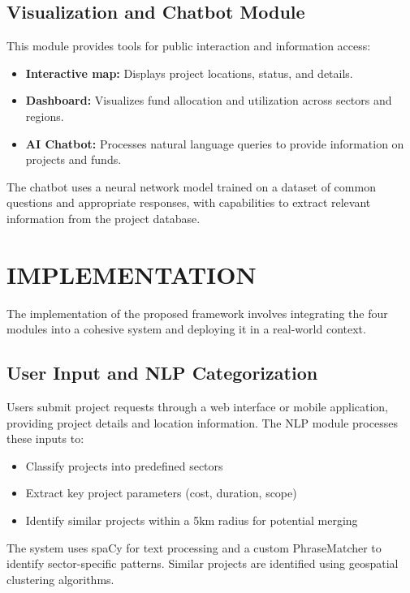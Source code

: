 \documentclass[12pt,a4paper]{report}
\begin{document}
\section{Visualization and Chatbot Module}
\indent \indent This module provides tools for public interaction and information access:

\begin{itemize}
    \item \textbf{Interactive map:} Displays project locations, status, and details.
    \item \textbf{Dashboard:} Visualizes fund allocation and utilization across sectors and regions.
    \item \textbf{AI Chatbot:} Processes natural language queries to provide information on projects and funds.
\end{itemize}

\noindent The chatbot uses a neural network model trained on a dataset of common questions and appropriate responses, with capabilities to extract relevant information from the project database.

\chapter{IMPLEMENTATION}
\indent \indent The implementation of the proposed framework involves integrating the four modules into a cohesive system and deploying it in a real-world context.

\section{User Input and NLP Categorization}
\indent \indent Users submit project requests through a web interface or mobile application, providing project details and location information. The NLP module processes these inputs to:

\begin{itemize}
    \item Classify projects into predefined sectors
    \item Extract key project parameters (cost, duration, scope)
    \item Identify similar projects within a 5km radius for potential merging
\end{itemize}

\noindent The system uses spaCy for text processing and a custom PhraseMatcher to identify sector-specific patterns. Similar projects are identified using geospatial clustering algorithms.
\end{document}
